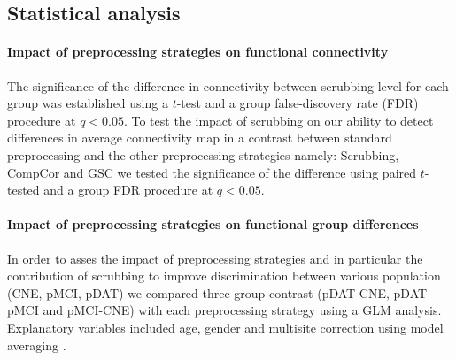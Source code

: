 \documentclass[authoryear]{elsarticle}
\begin{document}

\subsection{Statistical analysis}  
\paragraph{Impact of preprocessing strategies on functional connectivity}
The significance of the difference in connectivity between scrubbing level for each group was established using a $t$-test and a group false-discovery rate (FDR) procedure \cite{Hu2010} at $q<0.05$. To test the impact of scrubbing on our ability to detect differences in average connectivity map in a contrast between standard preprocessing and the other preprocessing strategies namely: Scrubbing, CompCor and GSC we tested the significance of the difference using paired $t$-tested and a group FDR procedure at $q<0.05$.

\paragraph{Impact of preprocessing strategies on functional group differences}
In order to asses the impact of preprocessing strategies and in particular the contribution of scrubbing to improve discrimination between various population (CNE, pMCI, pDAT) we compared three group contrast (pDAT-CNE, pDAT-pMCI and pMCI-CNE) with each preprocessing strategy using a GLM analysis. Explanatory variables included age, gender and multisite correction using model averaging \citep{Willer2010}.
\end{document}
